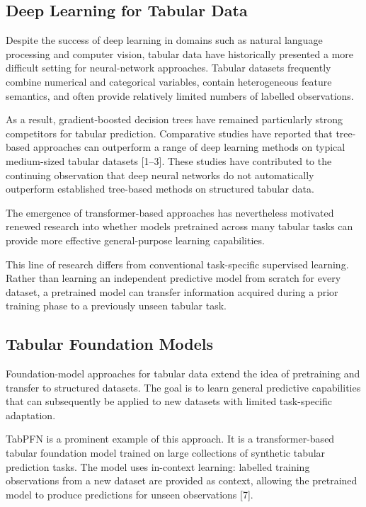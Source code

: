 \subsection{Deep Learning for Tabular Data}\label{deep-learning-for-tabular-data}

Despite the success of deep learning in domains such as natural language processing and computer vision, tabular data have historically presented a more difficult setting for neural-network approaches. Tabular datasets frequently combine numerical and categorical variables, contain heterogeneous feature semantics, and often provide relatively limited numbers of labelled observations.

As a result, gradient-boosted decision trees have remained particularly strong competitors for tabular prediction. Comparative studies have reported that tree-based approaches can outperform a range of deep learning methods on typical medium-sized tabular datasets {[}1--3{]}. These studies have contributed to the continuing observation that deep neural networks do not automatically outperform established tree-based methods on structured tabular data.

The emergence of transformer-based approaches has nevertheless motivated renewed research into whether models pretrained across many tabular tasks can provide more effective general-purpose learning capabilities.

This line of research differs from conventional task-specific supervised learning. Rather than learning an independent predictive model from scratch for every dataset, a pretrained model can transfer information acquired during a prior training phase to a previously unseen tabular task.

\subsection{Tabular Foundation Models}\label{tabular-foundation-models}

Foundation-model approaches for tabular data extend the idea of pretraining and transfer to structured datasets. The goal is to learn general predictive capabilities that can subsequently be applied to new datasets with limited task-specific adaptation.

TabPFN is a prominent example of this approach. It is a transformer-based tabular foundation model trained on large collections of synthetic tabular prediction tasks. The model uses in-context learning: labelled training observations from a new dataset are provided as context, allowing the pretrained model to produce predictions for unseen observations {[}7{]}.

